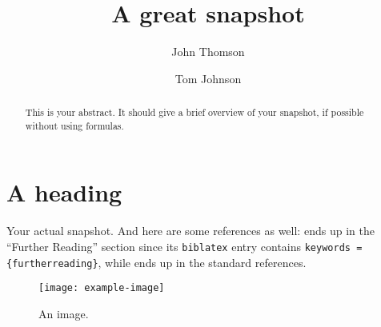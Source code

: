 \documentclass{mfosnapshot}
\author{John Thomson \and Tom Johnson}
\title{A great snapshot}
\begin{document}
\begin{abstract}
This is your abstract. It should give a brief overview of your snapshot, if possible without using formulas. 
\end{abstract}

% 
\section{A heading}
Your actual snapshot. And here are some references as well: \cite{knuth1977fast} ends up in the \enquote{Further Reading} section since its \texttt{biblatex} entry contains \verb!keywords = {furtherreading}!, while \cite{knuth1986texbook} ends up in the standard references.

\begin{figure}[h]
        \centering \texttt{[image: example-image]}
        \caption{An image.}
\label{fig:moon}
\end{figure}


\end{document}
